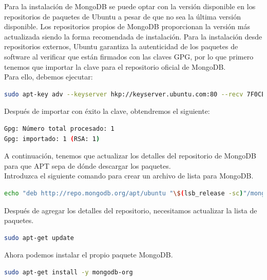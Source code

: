 \begin{appendices}
Para la instalación de MongoDB se puede optar con la versión disponible en los repositorios de paquetes de Ubuntu a pesar de que no sea la última versión disponible. Los repositorios propios de MongoDB proporcionan
la versión más actualizada siendo la forma recomendada de instalación. Para la instalación desde repositorios externos, Ubuntu garantiza la autenticidad de los paquetes de software al verificar que están firmados
con las claves GPG, por lo que primero tenemos que importar la clave para el repositorio oficial de MongoDB.\\

Para ello, debemos ejecutar:\\

\begin{lstlisting}[language=bash]
sudo apt-key adv --keyserver hkp://keyserver.ubuntu.com:80 --recv 7F0CEB10
\end{lstlisting}


Después de importar con éxito la clave, obtendremos el siguiente:\\

\begin{lstlisting}[language=bash]
Gpg: Número total procesado: 1
Gpg: importado: 1 (RSA: 1)
\end{lstlisting}

A continuación, tenemos que actualizar los detalles del repositorio de MongoDB para que APT sepa de dónde descargar los paquetes.\\

Introduzca el siguiente comando para crear un archivo de lista para MongoDB.\\

\begin{lstlisting}[language=bash]
echo "deb http://repo.mongodb.org/apt/ubuntu "\$(lsb_release -sc)"/mongodb-org/3.0 multiverse" | sudo tee /etc/apt/sources.list.d/mongodb-org-3.0.list
\end{lstlisting}

Después de agregar los detalles del repositorio, necesitamos actualizar la lista de paquetes.\\

\begin{lstlisting}[language=bash]
sudo apt-get update
\end{lstlisting}


Ahora podemos instalar el propio paquete MongoDB.\\

\begin{lstlisting}[language=bash]
sudo apt-get install -y mongodb-org
\end{lstlisting}


\end{appendices}
